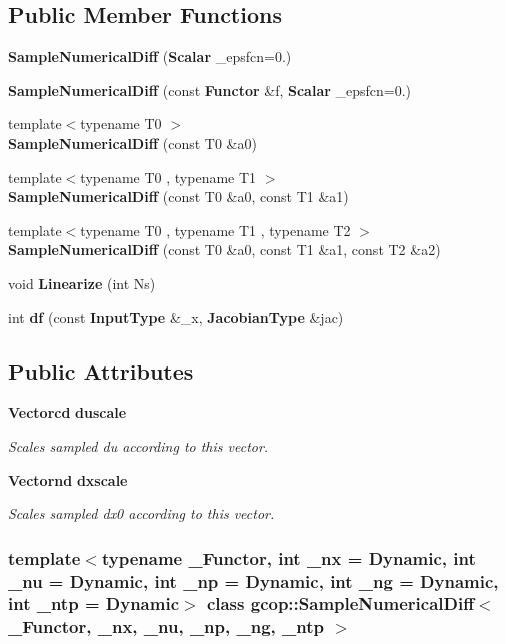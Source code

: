 \subsection*{\-Public \-Member \-Functions}
\begin{DoxyCompactItemize}
\item 
{\bf \-Sample\-Numerical\-Diff} ({\bf \-Scalar} \-\_\-epsfcn=0.)
\item 
{\bf \-Sample\-Numerical\-Diff} (const {\bf \-Functor} \&f, {\bf \-Scalar} \-\_\-epsfcn=0.)
\item 
{\footnotesize template$<$typename T0 $>$ }\\{\bf \-Sample\-Numerical\-Diff} (const \-T0 \&a0)
\item 
{\footnotesize template$<$typename T0 , typename T1 $>$ }\\{\bf \-Sample\-Numerical\-Diff} (const \-T0 \&a0, const \-T1 \&a1)
\item 
{\footnotesize template$<$typename T0 , typename T1 , typename T2 $>$ }\\{\bf \-Sample\-Numerical\-Diff} (const \-T0 \&a0, const \-T1 \&a1, const \-T2 \&a2)
\item 
void {\bf \-Linearize} (int \-Ns)
\item 
int {\bf df} (const {\bf \-Input\-Type} \&\-\_\-x, {\bf \-Jacobian\-Type} \&jac)
\end{DoxyCompactItemize}
\subsection*{\-Public \-Attributes}
\begin{DoxyCompactItemize}
\item 
{\bf \-Vectorcd} {\bf duscale}
\begin{DoxyCompactList}\small\item\em \-Scales sampled du according to this vector. \end{DoxyCompactList}\item 
{\bf \-Vectornd} {\bf dxscale}
\begin{DoxyCompactList}\small\item\em \-Scales sampled dx0 according to this vector. \end{DoxyCompactList}\end{DoxyCompactItemize}
\subsubsection*{template$<$typename \-\_\-\-Functor, int \-\_\-nx = \-Dynamic, int \-\_\-nu = \-Dynamic, int \-\_\-np = \-Dynamic, int \-\_\-ng = \-Dynamic, int \-\_\-ntp = \-Dynamic$>$ class gcop\-::\-Sample\-Numerical\-Diff$<$ \-\_\-\-Functor, \-\_\-nx, \-\_\-nu, \-\_\-np, \-\_\-ng, \-\_\-ntp $>$}



